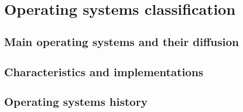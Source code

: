 \documentclass[../main.tex]{subfiles}
\begin{document}
\clearpage
\thispagestyle{empty}
\vspace*{7cm}
\section{Operating systems classification}
\vspace*{1.5cm}


\subsection{Main operating systems and their diffusion}

\subsection{Characteristics and implementations}

\subsection{Operating systems history}
\end{document}
